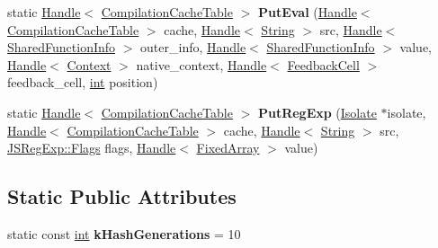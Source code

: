 \begin{DoxyCompactItemize}
\item 
\mbox{\label{classv8_1_1internal_1_1CompilationCacheTable_a3c0422109194cb0c74cf019a042e74e7}} 
static \mbox{\hyperlink{classv8_1_1internal_1_1Handle}{Handle}}$<$ \mbox{\hyperlink{classv8_1_1internal_1_1CompilationCacheTable}{Compilation\+Cache\+Table}} $>$ {\bfseries Put\+Eval} (\mbox{\hyperlink{classv8_1_1internal_1_1Handle}{Handle}}$<$ \mbox{\hyperlink{classv8_1_1internal_1_1CompilationCacheTable}{Compilation\+Cache\+Table}} $>$ cache, \mbox{\hyperlink{classv8_1_1internal_1_1Handle}{Handle}}$<$ \mbox{\hyperlink{classv8_1_1internal_1_1String}{String}} $>$ src, \mbox{\hyperlink{classv8_1_1internal_1_1Handle}{Handle}}$<$ \mbox{\hyperlink{classv8_1_1internal_1_1SharedFunctionInfo}{Shared\+Function\+Info}} $>$ outer\+\_\+info, \mbox{\hyperlink{classv8_1_1internal_1_1Handle}{Handle}}$<$ \mbox{\hyperlink{classv8_1_1internal_1_1SharedFunctionInfo}{Shared\+Function\+Info}} $>$ value, \mbox{\hyperlink{classv8_1_1internal_1_1Handle}{Handle}}$<$ \mbox{\hyperlink{classv8_1_1internal_1_1Context}{Context}} $>$ native\+\_\+context, \mbox{\hyperlink{classv8_1_1internal_1_1Handle}{Handle}}$<$ \mbox{\hyperlink{classv8_1_1internal_1_1FeedbackCell}{Feedback\+Cell}} $>$ feedback\+\_\+cell, \mbox{\hyperlink{classint}{int}} position)
\item 
\mbox{\label{classv8_1_1internal_1_1CompilationCacheTable_a2b88730292eb5bb3426440234a203fe5}} 
static \mbox{\hyperlink{classv8_1_1internal_1_1Handle}{Handle}}$<$ \mbox{\hyperlink{classv8_1_1internal_1_1CompilationCacheTable}{Compilation\+Cache\+Table}} $>$ {\bfseries Put\+Reg\+Exp} (\mbox{\hyperlink{classv8_1_1internal_1_1Isolate}{Isolate}} $\ast$isolate, \mbox{\hyperlink{classv8_1_1internal_1_1Handle}{Handle}}$<$ \mbox{\hyperlink{classv8_1_1internal_1_1CompilationCacheTable}{Compilation\+Cache\+Table}} $>$ cache, \mbox{\hyperlink{classv8_1_1internal_1_1Handle}{Handle}}$<$ \mbox{\hyperlink{classv8_1_1internal_1_1String}{String}} $>$ src, \mbox{\hyperlink{classv8_1_1base_1_1Flags}{J\+S\+Reg\+Exp\+::\+Flags}} flags, \mbox{\hyperlink{classv8_1_1internal_1_1Handle}{Handle}}$<$ \mbox{\hyperlink{classv8_1_1internal_1_1FixedArray}{Fixed\+Array}} $>$ value)
\end{DoxyCompactItemize}
\subsection*{Static Public Attributes}
\begin{DoxyCompactItemize}
\item 
\mbox{\label{classv8_1_1internal_1_1CompilationCacheTable_adb7672181225869e9b8ca7d196e9f574}} 
static const \mbox{\hyperlink{classint}{int}} {\bfseries k\+Hash\+Generations} = 10
\end{DoxyCompactItemize}

